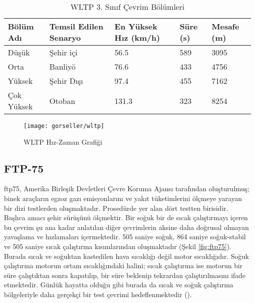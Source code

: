 \begin{table}
        \centering
        \caption{WLTP 3. Sınıf Çevrim Bölümleri}\label{tab:wltpclass3tablosu}
        \begin{tabular}{|l|l|l|l|l|}
            \hline
            \textbf{Bölüm Adı} & \textbf{Temsil Edilen Senaryo} & \textbf{En Yüksek Hız (km/h)} & \textbf{Süre (s)} & \textbf{Mesafe (m)} \\ \hline
            Düşük              & Şehir içi                      & 56.5                          & 589               & 3095                \\ \hline
            Orta               & Banliyö                        & 76.6                          & 433               & 4756                \\ \hline
            Yüksek             & Şehir Dışı                     & 97.4                          & 455               & 7162                \\ \hline
            Çok Yüksek         & Otoban                         & 131.3                         & 323               & 8254                \\ \hline
    \end{tabular}
\end{table}


\begin{figure}[h]
    \centering
    \texttt{[image: gorseller/wltp]}
    \caption{WLTP Hız-Zaman Grafiği}\label{fig:wltp}
\end{figure}

\subsection{FTP-75}
\acrfull{ftp75}, Amerika Birleşik Devletleri Çevre Koruma Ajansı tarafından oluşturulmuş; binek araçların egzoz gazı emisyonlarını ve yakıt tüketimlerini ölçmeye yarayan bir dizi testlerden oluşmaktadır.
Prosedürde yer alan dört testten birisidir. Başlıca amacı şehir sürüşünü ölçmektir. Bir soğuk bir de sıcak çalıştırmayı içeren bu çevrim şu ana kadar anlatılan diğer çevrimlerin aksine daha doğrusal olmayan yavaşlama ve hızlamaları içermektedir.
505 saniye soğuk, 864 saniye soğuk-stabil ve 505 saniye sıcak çalıştırma kısımlarından oluşmaktadır (Şekil \ref{fig:ftp75}). Burada sıcak ve soğuktan kastedilen hava sıcaklığı değil motor sıcaklığıdır. Soğuk çalıştırma motorun ortam sıcaklığındaki halini; sıcak çalıştırma ise motorun bir süre çalıştıktan sonra kapatılıp, bir süre beklenip tekrardan çalıştırılmasını ifade etmektedir.
Günlük hayatta olduğu gibi burada da sıcak ve soğuk çalıştırma bölgeleriyle daha gerçekçi bir test çevrimi hedeflenmektedir (\cite{ftp75nedir}).

